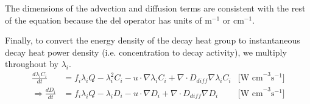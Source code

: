 \documentclass[letterpaper,11pt]{article}
\begin{document}
The dimensions of the advection and diffusion terms are consistent with the
rest of the equation because the del operator has units of m$^{-1}$ or
cm$^{-1}$.

Finally, to convert the energy density of the decay heat group to
instantaneous decay heat power density (i.e. concentration to decay activity),
we multiply throughout by $\lambda_i$.
%
\begin{align}
\frac{d \lambda_i C_i}{dt} &= f_i \lambda_i Q - \lambda_i^2 C_i - u \cdot\nabla \lambda_i C_i + \nabla \cdot D_{diff} \nabla \lambda_i C_i & \text{[W cm}^{-3} \text{s}^{-1} \text{]} \\
\Rightarrow \frac{d D_i}{dt} &= f_i \lambda_i Q - \lambda_i D_i - u \cdot\nabla D_i + \nabla \cdot D_{diff} \nabla D_i & \text{[W cm}^{-3} \text{s}^{-1} \text{]}
\end{align}
\end{document}

